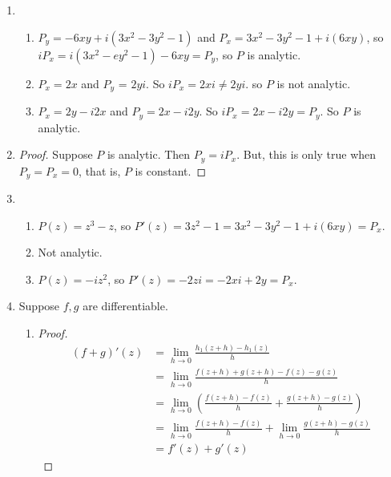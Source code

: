 \documentclass[11pt, letterpaper]{article}
\begin{document}
\thispagestyle{firststyle}


\begin{enumerate}
  \item \begin{enumerate}
    \item $P_y = - 6xy + i(3x^2 - 3y^2 - 1)$ and $P_x = 3x^2 - 3y^2 - 1 + i(6xy)$, so $iP_x = i(3x^2 - ey^2 - 1) - 6xy = P_y$, so $P$ is analytic.
    \item $P_x = 2x$ and $P_y$ = $2yi$. So $iP_x = 2xi \neq 2yi$. so $P$ is not analytic.
    \item $P_x = 2y - i2x$ and $P_y = 2x - i2y$. So $iP_x = 2x - i2y = P_y$. So $P$ is analytic.
  \end{enumerate}

  \item \begin{proof}
    Suppose $P$ is analytic. Then $P_y = iP_x$. But, this is only true when $P_y = P_x = 0$, that is, $P$ is constant.
  \end{proof}
  
  \item \begin{enumerate}
    \item $P(z) = z^3 - z$, so $P'(z) = 3z^2 - 1 = 3x^2 - 3y^2 - 1 + i(6xy) = P_x$.
    \item Not analytic.
    \item $P(z) = -iz^2$, so $P'(z) = -2zi = -2xi + 2y = P_x$.
  \end{enumerate}

  \item Suppose $f, g$ are differentiable.
  \begin{enumerate}
    \item \begin{proof}
      \begin{align*}
        (f + g)'(z) 
        &= \lim_{h \to 0} \frac{h_1(z + h) - h_1(z)}{h} \\
        &= \lim_{h \to 0} \frac{f(z + h) + g(z + h) - f(z) - g(z)}{h} \\
        &= \lim_{h \to 0} \left( \frac{f(z + h) - f(z)}{h} + \frac{g(z + h) - g(z)}{h} \right) \\
        &= \lim_{h \to 0} \frac{f(z + h) - f(z)}{h} + \lim_{h \to 0} \frac{g(z + h) - g(z)}{h} \\
        &= f'(z) + g'(z)
      \end{align*}
    \end{proof}


\end{enumerate}
\end{enumerate}
\end{document}
